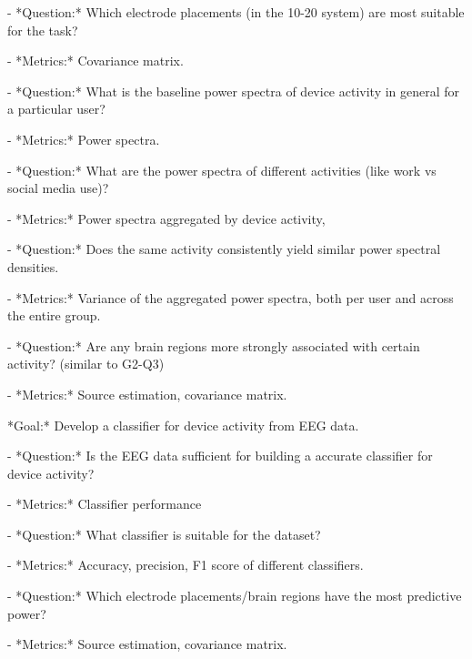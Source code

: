 \documentclass{IEEEtran}
\begin{document}
\begin{refsection}
\begin{markdown}
 - *Question:* Which electrode placements (in the 10-20 system) are most suitable for the task?

    - *Metrics:* Covariance matrix.

 - *Question:* What is the baseline power spectra of device activity in general for a particular user?

    - *Metrics:* Power spectra.

 - *Question:* What are the power spectra of different activities (like work vs social media use)?

    - *Metrics:* Power spectra aggregated by device activity,

 - *Question:* Does the same activity consistently yield similar power spectral densities.

    - *Metrics:* Variance of the aggregated power spectra, both per user and across the entire group.

 - *Question:* Are any brain regions more strongly associated with certain activity? (similar to G2-Q3)

    - *Metrics:* Source estimation, covariance matrix.
\end{markdown}


\begin{markdown}
*Goal:* Develop a classifier for device activity from EEG data.

 - *Question:* Is the EEG data sufficient for building a accurate classifier for device activity?

    - *Metrics:* Classifier performance

 - *Question:* What classifier is suitable for the dataset?

    - *Metrics:* Accuracy, precision, F1 score of different classifiers.

 - *Question:* Which electrode placements/brain regions have the most predictive power?

    - *Metrics:* Source estimation, covariance matrix.
\end{markdown}

%
%
%


\end{refsection}
\end{document}
